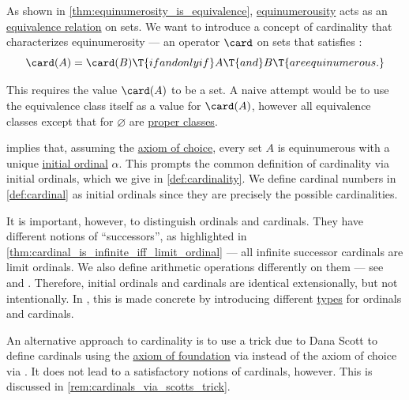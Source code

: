 \begin{remark}\label{rem:ordinals_and_cardinals}
  As shown in \cref{thm:equinumerosity_is_equivalence}, \hyperref[def:equinumerosity]{equinumerousity} acts as an \hyperref[def:equivalence_relation]{equivalence relation} on sets. We want to introduce a concept of cardinality that characterizes equinumerosity --- an operator \( \card \) on sets that satisfies :
  \begin{equation*}
    \card(A) = \card(B) \T{if and only if} A \T{and} B \T{are equinumerous.}
  \end{equation*}

  This requires the value \( \card(A) \) to be a set. A naive attempt would be to use the equivalence class itself as a value for \( \card(A) \), however all equivalence classes except that for \( \varnothing \) are \hyperref[con:set_theory_class]{proper classes}.

   implies that, assuming the \hyperref[def:zfc/choice]{axiom of choice}, every set \( A \) is equinumerous with a unique \hyperref[def:initial_ordinal]{initial ordinal} \( \alpha \). This prompts the common definition of cardinality via initial ordinals, which we give in \cref{def:cardinality}. We define cardinal numbers in \cref{def:cardinal} as initial ordinals since they are precisely the possible cardinalities.

  It is important, however, to distinguish ordinals and cardinals. They have different notions of \enquote{successors}, as highlighted in \cref{thm:cardinal_is_infinite_iff_limit_ordinal} --- all infinite successor cardinals are limit ordinals. We also define arithmetic operations differently on them --- see  and . Therefore, initial ordinals and cardinals are identical extensionally, but not intentionally. In \cite[ch. 10]{UnivalentFoundationsProgram2013HoTT}, this is made concrete by introducing different \hyperref[def:type_assertion]{types} for ordinals and cardinals.
\end{remark}
\begin{comments}
  \item An alternative approach to cardinality is to use a trick due to Dana Scott to define cardinals using the \hyperref[def:zfc/foundation]{axiom of foundation} via  instead of the axiom of choice via . It does not lead to a satisfactory notions of cardinals, however. This is discussed in \cref{rem:cardinals_via_scotts_trick}.
\end{comments}

